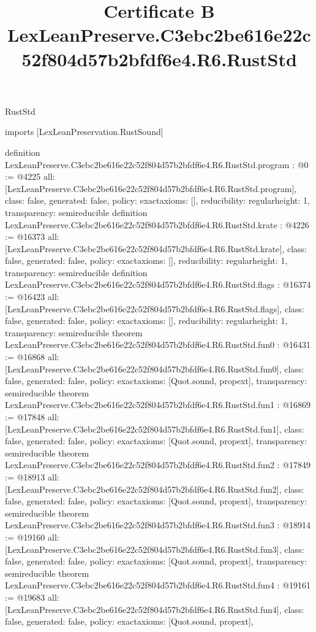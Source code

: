 \begin{lexlean}{RustStd}
\title{Certificate B LexLeanPreserve.C3ebc2be616e22c52f804d57b2bfdf6e4.R6.RustStd}
\begin{coremodule}
imports [LexLeanPreservation.RustSound]

definition LexLeanPreserve.C3ebc2be616e22c52f804d57b2bfdf6e4.R6.RustStd.program : @0 := @4225 {
  all: [LexLeanPreserve.C3ebc2be616e22c52f804d57b2bfdf6e4.R6.RustStd.program],
  class: false,
  generated: false,
  policy: exact{axioms: []},
  reducibility: regular{height: 1},
  transparency: semireducible
}
definition LexLeanPreserve.C3ebc2be616e22c52f804d57b2bfdf6e4.R6.RustStd.krate : @4226 := @16373 {
  all: [LexLeanPreserve.C3ebc2be616e22c52f804d57b2bfdf6e4.R6.RustStd.krate],
  class: false,
  generated: false,
  policy: exact{axioms: []},
  reducibility: regular{height: 1},
  transparency: semireducible
}
definition LexLeanPreserve.C3ebc2be616e22c52f804d57b2bfdf6e4.R6.RustStd.flags : @16374 := @16423 {
  all: [LexLeanPreserve.C3ebc2be616e22c52f804d57b2bfdf6e4.R6.RustStd.flags],
  class: false,
  generated: false,
  policy: exact{axioms: []},
  reducibility: regular{height: 1},
  transparency: semireducible
}
theorem LexLeanPreserve.C3ebc2be616e22c52f804d57b2bfdf6e4.R6.RustStd.fun0 : @16431 := @16868 {
  all: [LexLeanPreserve.C3ebc2be616e22c52f804d57b2bfdf6e4.R6.RustStd.fun0],
  class: false,
  generated: false,
  policy: exact{axioms: [Quot.sound, propext]},
  transparency: semireducible
}
theorem LexLeanPreserve.C3ebc2be616e22c52f804d57b2bfdf6e4.R6.RustStd.fun1 : @16869 := @17848 {
  all: [LexLeanPreserve.C3ebc2be616e22c52f804d57b2bfdf6e4.R6.RustStd.fun1],
  class: false,
  generated: false,
  policy: exact{axioms: [Quot.sound, propext]},
  transparency: semireducible
}
theorem LexLeanPreserve.C3ebc2be616e22c52f804d57b2bfdf6e4.R6.RustStd.fun2 : @17849 := @18913 {
  all: [LexLeanPreserve.C3ebc2be616e22c52f804d57b2bfdf6e4.R6.RustStd.fun2],
  class: false,
  generated: false,
  policy: exact{axioms: [Quot.sound, propext]},
  transparency: semireducible
}
theorem LexLeanPreserve.C3ebc2be616e22c52f804d57b2bfdf6e4.R6.RustStd.fun3 : @18914 := @19160 {
  all: [LexLeanPreserve.C3ebc2be616e22c52f804d57b2bfdf6e4.R6.RustStd.fun3],
  class: false,
  generated: false,
  policy: exact{axioms: [Quot.sound, propext]},
  transparency: semireducible
}
theorem LexLeanPreserve.C3ebc2be616e22c52f804d57b2bfdf6e4.R6.RustStd.fun4 : @19161 := @19683 {
  all: [LexLeanPreserve.C3ebc2be616e22c52f804d57b2bfdf6e4.R6.RustStd.fun4],
  class: false,
  generated: false,
  policy: exact{axioms: [Quot.sound, propext]},
}
\end{coremodule}
\end{lexlean}
